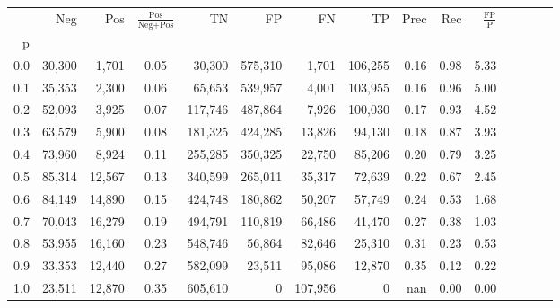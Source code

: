 \begin{tabular}{rrrcrrrrrrrrrrr}
\toprule
{} &     Neg &     Pos & $\frac{\text{Pos}}{\text{Neg}+\text{Pos}}$ &       TN &       FP &       FN &       TP &  Prec &   Rec & $\frac{\text{FP}}{\text{P}}$ \\
p   &         &         &                                            &          &          &          &          &       &       &                              \\
\midrule
0.0 &  30,300 &   1,701 &                                       0.05 &   30,300 &  575,310 &    1,701 &  106,255 &  0.16 &  0.98 &                         5.33 \\
0.1 &  35,353 &   2,300 &                                       0.06 &   65,653 &  539,957 &    4,001 &  103,955 &  0.16 &  0.96 &                         5.00 \\
0.2 &  52,093 &   3,925 &                                       0.07 &  117,746 &  487,864 &    7,926 &  100,030 &  0.17 &  0.93 &                         4.52 \\
0.3 &  63,579 &   5,900 &                                       0.08 &  181,325 &  424,285 &   13,826 &   94,130 &  0.18 &  0.87 &                         3.93 \\
0.4 &  73,960 &   8,924 &                                       0.11 &  255,285 &  350,325 &   22,750 &   85,206 &  0.20 &  0.79 &                         3.25 \\
0.5 &  85,314 &  12,567 &                                       0.13 &  340,599 &  265,011 &   35,317 &   72,639 &  0.22 &  0.67 &                         2.45 \\
0.6 &  84,149 &  14,890 &                                       0.15 &  424,748 &  180,862 &   50,207 &   57,749 &  0.24 &  0.53 &                         1.68 \\
0.7 &  70,043 &  16,279 &                                       0.19 &  494,791 &  110,819 &   66,486 &   41,470 &  0.27 &  0.38 &                         1.03 \\
0.8 &  53,955 &  16,160 &                                       0.23 &  548,746 &   56,864 &   82,646 &   25,310 &  0.31 &  0.23 &                         0.53 \\
0.9 &  33,353 &  12,440 &                                       0.27 &  582,099 &   23,511 &   95,086 &   12,870 &  0.35 &  0.12 &                         0.22 \\
1.0 &  23,511 &  12,870 &                                       0.35 &  605,610 &        0 &  107,956 &        0 &   nan &  0.00 &                         0.00 \\
\bottomrule
\end{tabular}
